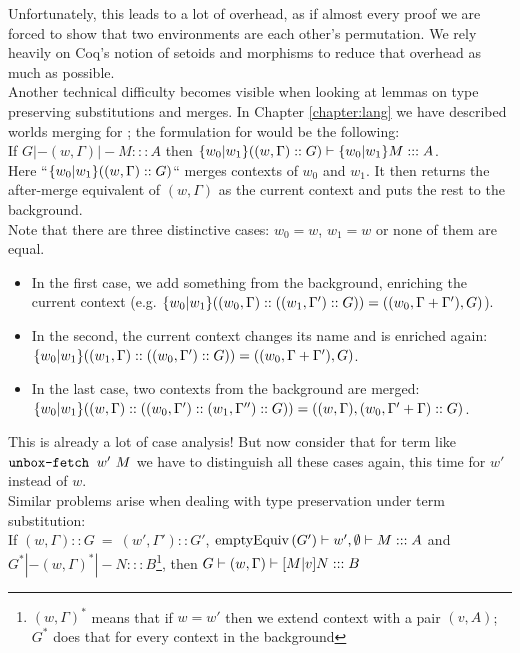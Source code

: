 Unfortunately, this leads to a lot of overhead, as if almost every proof we are forced to show that two environments are each other's permutation. We rely heavily on Coq's notion of setoids and morphisms to reduce that overhead as much as possible.\\

Another technical difficulty becomes visible when looking at lemmas on type preserving substitutions and merges. In Chapter \ref{chapter:lang} we have described worlds merging for \langL{}; the formulation for \langHyb{} would be the following:\\[0.2cm]
If $G |- (w, \Gamma) |- M ::: A$ then $\mbox{$ \{w_0 | w_1 \} ((w, \Gamma) :: G)$} |- \mbox{$ \{w_0 | w_1 \} M$} ::: A$.\\[0.2cm]
Here ``$\mbox{$ \{w_0 | w_1 \} ((w, \Gamma) :: G)$}$`` merges contexts of $w_0$ and $w_1$. It then returns the after-merge equivalent of $(w, \Gamma)$ as the current context and puts the rest to the background.\\
Note that there are three distinctive cases: $w_0 = w$, $w_1 = w$ or none of them are equal.
\begin{itemize}
\item[] In the first case, we add something from the background, enriching the current context (e.g. $\mbox{$ \{w_0 | w_1 \} ((w_0, \Gamma) :: ((w_1, \Gamma')::G))$} = ((w_0, \Gamma + \Gamma'), G)$).
\item[] In the second, the current context changes its name and is enriched again: $\mbox{$ \{w_0 | w_1 \} ((w_1, \Gamma) :: ((w_0, \Gamma')::G))$} = ((w_0, \Gamma + \Gamma'), G)$.
\item[] In the last case, two contexts from the background are merged: \\
$\mbox{$ \{w_0 | w_1 \} ((w, \Gamma) :: ((w_0, \Gamma')::(w_1, \Gamma'') :: G))$} = ((w, \Gamma), (w_0, \Gamma' +\Gamma) ::G)$.
\end{itemize}
This is already a lot of case analysis! But now consider that for term like $\mbox{$\operatorname{\texttt{unbox-fetch}}_{}\ {w'}\ {M}$}$ we have to distinguish all these cases again, this time for $w'$ instead of $w$.\\

Similar problems arise when dealing with type preservation under term substitution:\\[0.2cm]
If $ (w, \Gamma) :: G ~=~ (w', \Gamma') :: G'$, $\mbox{$\operatorname{emptyEquiv}{(G')}$} |- w', \mbox{$\emptyset$} |- M ::: A$ and\\
$G^{*} |- (w, \Gamma)^{*} |- N ::: B$\footnote{$(w, \Gamma)^{*}$ means that if $ w= w'$ then we extend context with a pair $(v, A)$; $G^{*}$ does that for every context in the background}, then $ G |- (w, \Gamma) |- \mbox{$ [M | v] N$} ::: B$
\\

